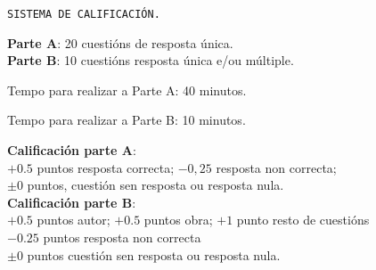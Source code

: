 \begin{instruccions}
    \par
    \vspace*{0.15cm}
    \begin{center}
    \texttt{SISTEMA DE CALIFICACIÓN.}
    \end{center}
    \par
    \vspace*{0.15cm}
    \textbf{Parte A}: 20 cuestións de resposta única.\\
    \textbf{Parte B}: 10 cuestións resposta única e/ou múltiple.
    \par
    \vspace*{0.15cm}
    Tempo para realizar a Parte A: 40 minutos.
    \par
    Tempo para realizar a Parte B: 10 minutos.
    \par
    \vspace*{0.15cm}
    \textbf{Calificación parte A}: \\
    $+ 0.5$ puntos resposta correcta; $-0,25$ resposta non correcta;\\ 
    $ \pm 0 $ puntos, cuestión sen resposta ou resposta nula.\\
    \vspace*{0.15cm}
    \textbf{Calificación parte B}:\\
    $ + 0.5 $ puntos autor; $ + 0.5 $ puntos obra; $ + 1 $ punto resto de cuestións\\
    $ - 0.25 $ puntos resposta non correcta \\
    $ \pm 0 $ puntos cuestión sen resposta ou resposta nula.\\
\end{instruccions}
%
\newpage
